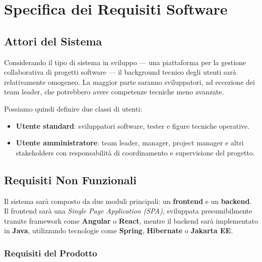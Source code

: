 \chapter{Specifica dei Requisiti Software}

\section{Attori del Sistema}

Considerando il tipo di sistema in sviluppo --- una piattaforma per la gestione collaborativa di progetti software --- il background tecnico degli utenti sarà relativamente omogeneo. La maggior parte saranno sviluppatori, ad eccezione dei team leader, che potrebbero avere competenze tecniche meno avanzate.

Possiamo quindi definire due classi di utenti:

\begin{itemize}
    \item \textbf{Utente standard}: sviluppatori software, tester e figure tecniche operative.
    \item \textbf{Utente amministratore}: team leader, manager, project manager e altri stakeholders con responsabilità di coordinamento e supervisione del progetto.
\end{itemize}


\section{Requisiti Non Funzionali}

Il sistema sarà composto da due moduli principali: un \textbf{frontend} e un \textbf{backend}.  
Il frontend sarà una \textit{Single Page Application (SPA)}, sviluppata presumibilmente tramite framework come \textbf{Angular} o \textbf{React}, mentre il backend sarà implementato in \textbf{Java}, utilizzando tecnologie come \textbf{Spring}, \textbf{Hibernate} o \textbf{Jakarta EE}.

\subsection{Requisiti del Prodotto}

